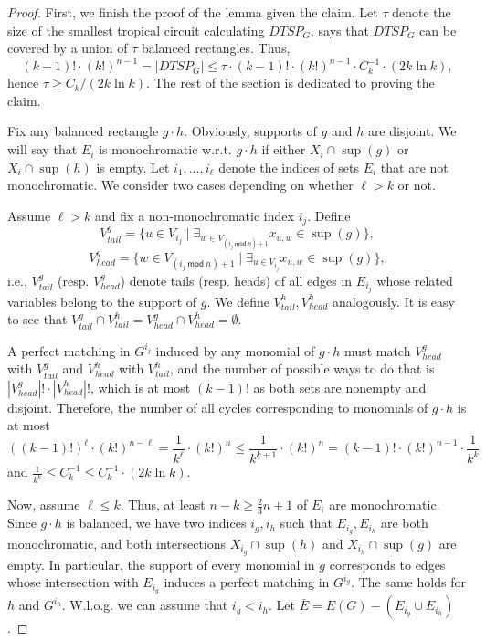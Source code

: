 \documentclass[11pt,a4paper]{article}
\renewcommand{\mod}{\ \mathsf{mod}\ }
\begin{document}
\begin{proof}
    First, we finish the proof of the lemma given the claim. Let $\tau$ denote the size of the smallest tropical circuit calculating $DTSP_G$.  says that $DTSP_G$ can be covered by a union of $\tau$ balanced rectangles. Thus,
    $$
        (k - 1)! \cdot (k!)^{n - 1} = |DTSP_G| \leq \tau \cdot (k - 1)! \cdot (k!)^{n - 1} \cdot C_k^{-1} \cdot (2k \ln k),
    $$
    hence
    $
    \tau \geq C_k / (2k \ln k).
    $
    The rest of the section is dedicated to proving the claim.
    \newline

    Fix any balanced rectangle $g \cdot h$. Obviously, supports of $g$ and $h$ are disjoint. We will say that $E_i$ is monochromatic w.r.t. $g \cdot h$ if either $X_i \cap \sup(g)$ or $X_i \cap \sup(h)$ is empty. Let $i_1, \dots, i_\ell$ denote the indices of sets $E_i$ that are not monochromatic. We consider two cases depending on whether $\ell > k$ or not.

    Assume $\ell > k$ and fix a non-monochromatic index $i_j$. Define
    $$
    V^g_{tail} = \{ u \in V_{i_j} \mid \exists_{w \in V_{(i_j \mod n) + 1}} x_{u, w} \in \sup(g) \},
    $$
    $$
    V^g_{head} = \{ w \in V_{(i_j \mod n) + 1} \mid \exists_{u \in V_{i_j}} x_{u, w} \in \sup(g) \},
    $$
    i.e., $V^g_{tail}$ (resp. $V^g_{head}$) denote tails (resp. heads) of all edges in $E_{i_j}$ whose related variables belong to the support of $g$. We define $V^h_{tail}, V^h_{head}$ analogously. It is easy to see that $V^g_{tail} \cap V^h_{tail} = V^g_{head} \cap V^h_{head} = \emptyset$.

    A perfect matching in $G^{i_j}$ induced by any monomial of $g \cdot h$ must match $V^g_{head}$ with $V^g_{tail}$ and $V^h_{head}$ with $V^h_{tail}$, and the number of possible ways to do that is
    $
    |V^g_{head}|! \cdot |V^h_{head}|!
    $, which is at most $(k - 1)!$ as both sets are nonempty and disjoint. Therefore, the number of all cycles corresponding to monomials of $g \cdot h$ is at most
    $$
    ((k - 1)!)^\ell \cdot (k!)^{n - \ell} = \frac{1}{k^\ell} \cdot (k!)^n \leq
    \frac{1}{k^{k + 1}} \cdot (k!)^n = (k - 1)! \cdot (k!)^{n - 1} \cdot \frac{1}{k^k}
    $$
    and $\frac{1}{k^k} \leq C_k^{-1} \leq C_k^{-1} \cdot (2k \ln k)$.
    \newline
    
    Now, assume $\ell \leq k$. Thus, at least $n - k \geq \frac{2}{3}n + 1$ of $E_i$ are monochromatic. Since $g \cdot h$ is balanced, we have two indices $i_g, i_h$ such that $E_{i_g}, E_{i_h}$ are both monochromatic, and both intersections $X_{i_g} \cap \sup(h)$ and $X_{i_h} \cap \sup(g)$ are empty. In particular, the support of every monomial in $g$ corresponds to edges whose intersection with $E_{i_g}$ induces a perfect matching in $G^{i_g}$. The same holds for $h$ and $G^{i_h}$. W.l.o.g. we can assume that $i_g < i_h$. Let $\bar{E} = E(G) - (E_{i_g} \cup E_{i_h})$.


\end{proof}
\end{document}
